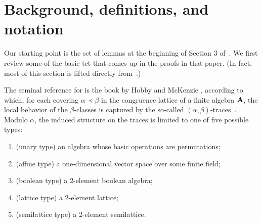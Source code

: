 \begin{comment}
\begin{prob}
  \label{prob:3}
  Is there an $\alg{A}$, idempotent and having a Taylor term, 
  no type-\atyp tail in 
  subalgebras of $\alg{A}^k$, for $k < n$, but having a type-\atyp 
  tail in a subalgebra of $\alg{A}^n$. 
\end{prob}
Perhaps we could construct such an algebra using congruence lattice
representation techniques. 
\end{comment}



\section{Background, definitions, and notation}
\label{sec:defin-notat}
Our starting point is the set of lemmas at the beginning of Section 3 of~\cite{Freese:2009}.
We first review some of the basic \ac{tct}
that comes up in the proofs in that paper. (In fact, most of this section 
is lifted directly from~\cite[Section~2]{Freese:2009}.)

The seminal reference for \tct is the book by Hobby and McKenzie
\cite{HM:1988}, according to which,
for each covering $\alpha \prec \beta$ in the congruence lattice of a finite
algebra $\mathbf{A}$, the local behavior of the $\beta$-classes is captured by the
so-called $(\alpha, \beta)$-traces~\cite[Def.~2.15]{HM:1988}.
Modulo $\alpha$, the induced structure on the traces is limited to one
of five possible types:

\begin{enumerate}[{\bf 1}]
\item  (unary type) an algebra whose basic operations are permutations;
\item  (affine type) a one-dimensional vector space over some finite field;
\item  (boolean type) a 2-element boolean algebra;
\item  (lattice type) a 2-element lattice;
\item  (semilattice type) a 2-element semilattice.
\end{enumerate}

